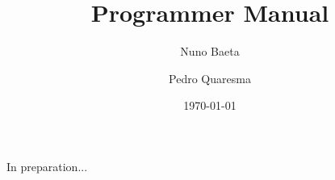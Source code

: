\documentclass{book}
\title{\OGP \linebreak Programmer Manual}
\author{Nuno Baeta \and Pedro Quaresma}
\date{\today}
\begin{document}
\maketitle

In preparation...
\end{document}
